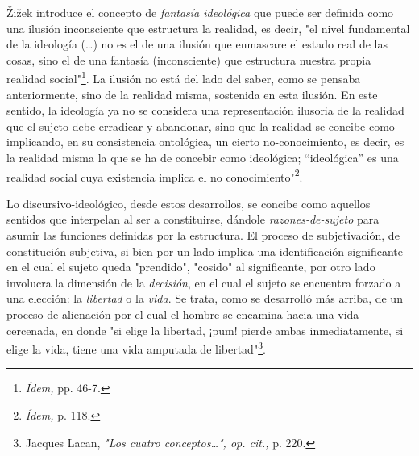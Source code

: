 Žižek introduce el concepto de \emph{fantasía ideológica} que puede ser
definida como una ilusión inconsciente que estructura la realidad, es
decir, "el nivel fundamental de la ideología (\dots) no es el de
una ilusión que enmascare el estado real de las cosas, sino el de una
fantasía (inconsciente) que estructura nuestra propia realidad
social"\footnote{\emph{Ídem,} pp. 46-7.}. La ilusión no está del lado
del saber, como se pensaba anteriormente, sino de la realidad misma,
sostenida en esta ilusión. En este sentido, la ideología ya no se
considera una representación ilusoria de la realidad que el sujeto debe
erradicar y abandonar, sino que la realidad se concibe como implicando,
en su consistencia ontológica, un cierto no-conocimiento, es decir, es
la realidad misma la que se ha de concebir como ideológica;
\enquote{ideológica} es una realidad social cuya existencia implica el no
conocimiento"\footnote{\emph{Ídem,} p. 118.}.

Lo discursivo-ideológico, desde estos desarrollos, se concibe como
aquellos sentidos que interpelan al ser a constituirse, dándole
\emph{razones-de-sujeto} para asumir las funciones definidas por la
estructura. El proceso de subjetivación, de constitución subjetiva, si
bien por un lado implica una identificación significante en el cual el
sujeto queda "prendido", "cosido" al significante, por otro lado
involucra la dimensión de la \emph{decisión}, en el cual el sujeto se
encuentra forzado a una elección: la \emph{libertad} o la \emph{vida}.
Se trata, como se desarrolló más arriba, de un proceso de alienación por
el cual el hombre se encamina hacia una vida cercenada, en donde "si
elige la libertad, ¡pum! pierde ambas inmediatamente, si elige la vida,
tiene una vida amputada de libertad"\footnote{Jacques Lacan, \emph{"Los
  cuatro conceptos\ldots", op. cit.,} p. 220.}.

